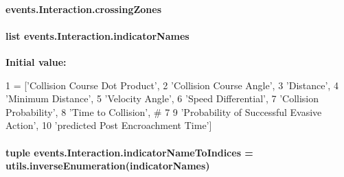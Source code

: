 \hypertarget{classevents_1_1Interaction_aabeafe12aba2ff523496001e85042e51}{
\paragraph[{crossing\-Zones}]{\setlength{\rightskip}{0pt plus 5cm}events.\-Interaction.\-crossing\-Zones}}\label{classevents_1_1Interaction_aabeafe12aba2ff523496001e85042e51}
\hypertarget{classevents_1_1Interaction_a573cc05c1d659e0d5912b3eb2361d43f}{
\paragraph[{indicator\-Names}]{\setlength{\rightskip}{0pt plus 5cm}list events.\-Interaction.\-indicator\-Names\hspace{0.3cm}{\ttfamily [static]}}}\label{classevents_1_1Interaction_a573cc05c1d659e0d5912b3eb2361d43f}
{\bfseries Initial value\-:}
\begin{DoxyCode}
1 = [\textcolor{stringliteral}{'Collision Course Dot Product'},
2                       \textcolor{stringliteral}{'Collision Course Angle'},
3                       \textcolor{stringliteral}{'Distance'},
4                       \textcolor{stringliteral}{'Minimum Distance'},
5                       \textcolor{stringliteral}{'Velocity Angle'},
6                       \textcolor{stringliteral}{'Speed Differential'},
7                       \textcolor{stringliteral}{'Collision Probability'},
8                       \textcolor{stringliteral}{'Time to Collision'}, \textcolor{comment}{# 7}
9                       \textcolor{stringliteral}{'Probability of Successful Evasive Action'},
10                       \textcolor{stringliteral}{'predicted Post Encroachment Time'}]
\end{DoxyCode}
\hypertarget{classevents_1_1Interaction_aed1115f38b9e2d6154ffa22d4c3c3455}{
\paragraph[{indicator\-Name\-To\-Indices}]{\setlength{\rightskip}{0pt plus 5cm}tuple events.\-Interaction.\-indicator\-Name\-To\-Indices = {\bf utils.\-inverse\-Enumeration}({\bf indicator\-Names})\hspace{0.3cm}{\ttfamily [static]}}}\label{classevents_1_1Interaction_aed1115f38b9e2d6154ffa22d4c3c3455}

